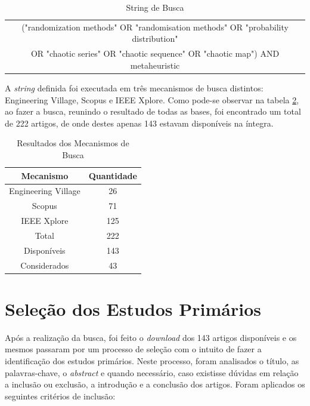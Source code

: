 \begin{table}[!htpb]
    \centering
    \begin{tabular}{|c|}
    \hline
        ("randomization methods" \- OR "randomisation methods" \- OR "probability distribution" \- \\OR "chaotic series" \- OR "chaotic sequence" \- OR "chaotic map") AND metaheuristic \\
    \hline
    \end{tabular}
    \caption{String de Busca}
    \label{tab:string}
\end{table}


A \textit{string} definida foi executada em três mecanismos de busca distintos: Engineering Village, Scopus e IEEE Xplore. Como pode-se observar na tabela \ref{tab:resultado}, ao fazer a busca, reunindo o resultado de todas as bases, foi encontrado um total de 222 artigos, de onde destes apenas 143 estavam disponíveis na íntegra.

\begin{table}[!htpb]
    \centering
    \begin{tabular}{c|c} %
      \textbf{Mecanismo} & \textbf{Quantidade} \\
      \hline
      Engineering Village & 26\\
      Scopus & 71\\
      IEEE Xplore & 125\\
      \hline
      Total & 222\\
      Disponíveis & 143\\
      Considerados & 43\\
    \end{tabular}
    \caption{Resultados dos Mecanismos de Busca}
    \label{tab:resultado}
\end{table}

\section{Seleção dos Estudos Primários}

Após a realização da busca, foi feito o \textit{download} dos 143 artigos disponíveis e os mesmos passaram por um processo de seleção com o intuito de fazer a identificação dos estudos primários. Neste processo, foram analisados o título, as palavras-chave, o \textit{abstract} e quando necessário, caso existisse dúvidas em relação a inclusão ou exclusão, a introdução e a conclusão dos artigos. Foram aplicados os seguintes critérios de inclusão:

